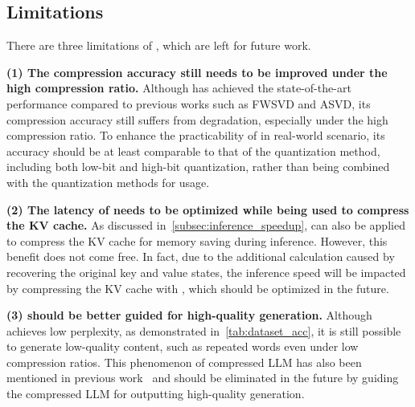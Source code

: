 
\subsection{Limitations}
There are three limitations of \sysname, which are left for future work.

\textbf{(1) The compression accuracy still needs to be improved under the high compression ratio.}
Although \sysname has achieved the state-of-the-art performance compared to previous works such as FWSVD and ASVD, its compression accuracy still suffers from degradation, especially under the high compression ratio. To enhance the practicability of \sysname in real-world scenario, its accuracy should be at least comparable to that of the quantization method, including both low-bit and high-bit quantization, rather than being combined with the quantization methods for usage.

\textbf{(2) The latency of \sysname needs to be optimized while being used to compress the KV cache.} As discussed in~\cref{subsec:inference_speedup}, \sysname can also be applied to compress the KV cache for memory saving during inference. However, this benefit does not come free. In fact, due to the additional calculation caused by recovering the original key and value states, the inference speed will be impacted by compressing the KV cache with \sysname, which should be optimized in the future.


\textbf{(3) \sysname should be better guided for high-quality generation.} Although \sysname achieves low perplexity, as demonstrated in~\cref{tab:dataset_acc}, it is still possible to generate low-quality content, such as repeated words even under low compression ratios. This phenomenon of compressed LLM has also been mentioned in previous work~\citep{DBLP:conf/nips/MaFW23} and should be eliminated in the future by guiding the compressed LLM for outputting high-quality generation.